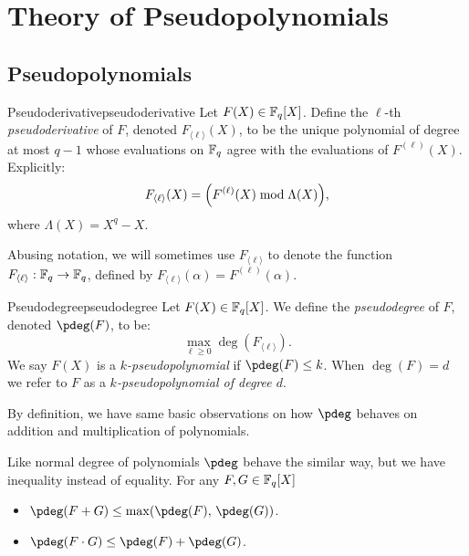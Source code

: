 \section{Theory of Pseudopolynomials}\label{sec:pseudopolynomials}

\subsection{Pseudopolynomials}
\begin{Definition}{Pseudoderivative}{pseudoderivative}
  Let $F(X) \in \mathbb{F}_q[X]$. Define the $\ell$-th \emph{pseudoderivative} of $F$, denoted $F_{\langle\ell\rangle}(X)$, to be the unique polynomial of degree at most $q - 1$ whose evaluations on $\mathbb{F}_q$ agree with the evaluations of $F^{(\ell)}(X)$. Explicitly:
  \[
    F_{\langle\ell\rangle}(X) = \Bigl(F^{(\ell)}(X) \bmod \Lambda(X)\Bigr),
  \]
  where $\Lambda(X) = X^q - X$.

  Abusing notation, we will sometimes use $F_{\langle\ell\rangle}$ to denote the function $F_{\langle\ell\rangle} : \mathbb{F}_q \to \mathbb{F}_q$, defined by $F_{\langle\ell\rangle}(\alpha) = F^{(\ell)}(\alpha)$.
\end{Definition}

\begin{Definition}{Pseudodegree}{pseudodegree}
  Let $F(X) \in \mathbb{F}_q[X]$. We define the \emph{pseudodegree} of $F$, denoted $\pdeg(F)$, to be:
  \[
    \max_{\ell \geq 0} \deg(F_{\langle\ell\rangle}).
  \]
  We say $F(X)$ is a \emph{$k$-pseudopolynomial} if $\pdeg(F) \leq k$. When $\deg(F) = d$ we refer to $F$ as a \emph{$k$-pseudopolynomial of degree $d$}.
\end{Definition}

By definition, we have same basic observations on how $\pdeg$ behaves on addition and multiplication of polynomials.

\begin{observation}
  Like normal degree of polynomials $\pdeg$ behave the similar way, but we have inequality instead of equality. For any $F,G\in\mathbb{F}_q[X]$
  \begin{itemize}
    \item $\pdeg(F + G) \leq \max(\pdeg(F),\, \pdeg(G))$.
    \item $\pdeg(F \cdot G) \leq \pdeg(F) + \pdeg(G)$.
  \end{itemize}
\end{observation}

